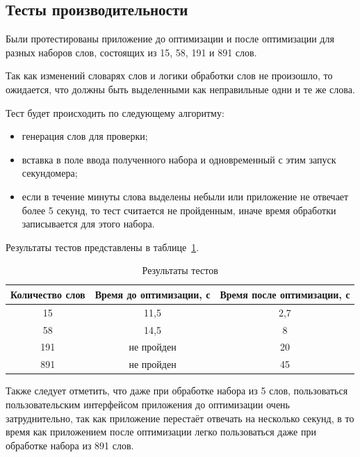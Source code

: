 \subsection{Тесты производительности}

Были протестированы приложение до оптимизации и после оптимизации для разных наборов слов, состоящих из 15, 58, 191 и 891 слов.

Так как изменений словарях слов и логики обработки слов не произошло, то ожидается, что должны быть выделенными как неправильные одни и те же слова.

Тест будет происходить по следующему алгоритму:

\begin{itemize}
  \item генерация слов для проверки;
  \item вставка в поле ввода полученного набора и одновременный с этим запуск секундомера;
  \item если в течение минуты слова выделены небыли или приложение не отвечает более 5 секунд, то тест считается не пройденным, иначе время обработки записывается для этого набора.
\end{itemize}

Результаты тестов представлены в таблице~\ref{table:tests}.

\begin{table}[H]
  \caption{Результаты тестов}
  \begin{tabular}{ |c|c|c| } 
    \hline

    Количество слов & Время до оптимизации, с & Время после оптимизации, с\\ \hline
    15 & 11,5 & 2,7\\
    \hline
    58 & 14,5 & 8\\
    \hline
    191 & не пройден & 20\\
    \hline
    891 & не пройден & 45\\
    
    \hline
   \end{tabular}
\label{table:tests}

\end{table}

Также следует отметить, что даже при обработке набора из 5 слов, пользоваться пользовательским интерфейсом приложения до оптимизации очень затруднительно, так как приложение перестаёт отвечать на несколько секунд, в то время как приложением после оптимизации легко пользоваться даже при обработке набора из 891 слов.

